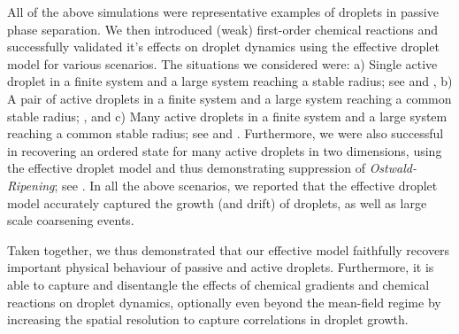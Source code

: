 All of the above simulations were representative examples of droplets in passive phase separation. 
We then introduced (weak) first-order chemical reactions and successfully validated it's effects on droplet dynamics using the effective droplet model for various scenarios.
The situations we considered were: a) Single active droplet in a finite system and a large system reaching a stable radius; see  and , b) A pair of active droplets in a finite system and a large system reaching a common stable radius; , and c) Many active droplets in a finite system and a large system reaching a common stable radius; see  and .
Furthermore, we were also successful in recovering an ordered state for many active droplets in two dimensions, using the effective droplet model and thus demonstrating suppression of \textit{Ostwald-Ripening}; see .
In all the above scenarios, we reported that the effective droplet model accurately captured the growth (and drift) of droplets, as well as large scale coarsening events.

Taken together, we thus demonstrated that our effective model faithfully recovers important physical behaviour of passive and active droplets.
Furthermore, it is able to capture and disentangle the effects of chemical gradients and chemical reactions on droplet dynamics, optionally even beyond the mean-field regime by increasing the spatial resolution to capture correlations in droplet growth.

